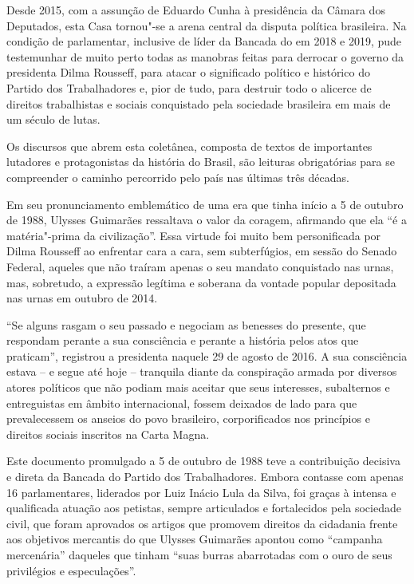 Desde 2015, com a assunção de Eduardo Cunha à presidência da Câmara dos
Deputados, esta Casa tornou"-se a arena central da disputa política
brasileira. Na condição de parlamentar, inclusive de líder da Bancada do
 em 2018 e 2019, pude testemunhar de muito perto todas as manobras
feitas para derrocar o governo da presidenta Dilma Rousseff, para atacar
o significado político e histórico do Partido dos Trabalhadores e, pior
de tudo, para destruir todo o alicerce de direitos trabalhistas e
sociais conquistado pela sociedade brasileira em mais de um século de
lutas.

Os discursos que abrem esta coletânea, composta de textos de importantes
lutadores e protagonistas da história do Brasil, são leituras
obrigatórias para se compreender o caminho percorrido pelo país nas
últimas três décadas.

Em seu pronunciamento emblemático de uma era que tinha início a 5 de
outubro de 1988, Ulysses Guimarães ressaltava o valor da coragem,
afirmando que ela ``é a matéria"-prima da civilização''. Essa virtude foi
muito bem personificada por Dilma Rousseff ao enfrentar cara a cara, sem
subterfúgios, em sessão do Senado Federal, aqueles que não traíram
apenas o seu mandato conquistado nas urnas, mas, sobretudo, a expressão
legítima e soberana da vontade popular depositada nas urnas em outubro
de 2014.

``Se alguns rasgam o seu passado e negociam as benesses do presente, que
respondam perante a sua consciência e perante a história pelos atos que
praticam'', registrou a presidenta naquele 29 de agosto de 2016. A sua
consciência estava -- e segue até hoje -- tranquila diante da
conspiração armada por diversos atores políticos que não podiam mais
aceitar que seus interesses, subalternos e entreguistas em âmbito
internacional, fossem deixados de lado para que prevalecessem os anseios
do povo brasileiro, corporificados nos princípios e direitos sociais
inscritos na Carta Magna.

Este documento promulgado a 5 de outubro de 1988 teve a contribuição
decisiva e direta da Bancada do Partido dos Trabalhadores. Embora
contasse com apenas 16 parlamentares, liderados por Luiz Inácio Lula da
Silva, foi graças à intensa e qualificada atuação aos petistas, sempre
articulados e fortalecidos pela sociedade civil, que foram aprovados os
artigos que promovem direitos da cidadania frente aos objetivos
mercantis do que Ulysses Guimarães apontou como ``campanha mercenária''
daqueles que tinham ``suas burras abarrotadas com o ouro de seus
privilégios e especulações''.

